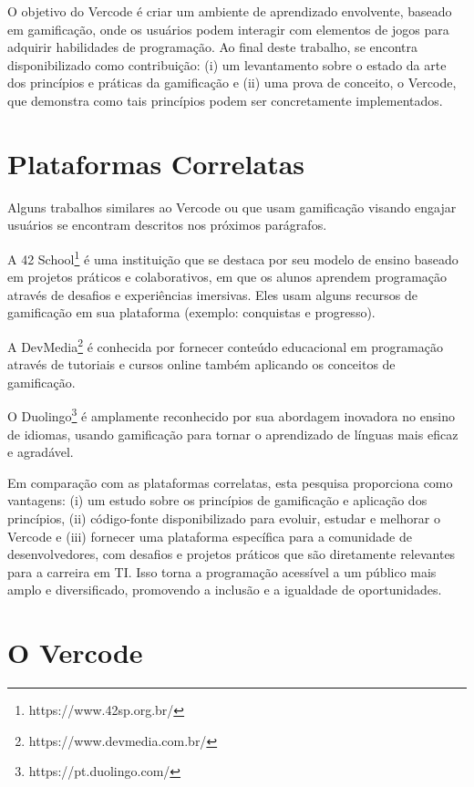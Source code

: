 \documentclass[12pt]{article}
\begin{document}
O objetivo do Vercode é criar um ambiente de aprendizado envolvente, baseado em gamificação, onde os usuários podem interagir com elementos de jogos para adquirir habilidades de programação. Ao final deste trabalho, se encontra disponibilizado como contribuição: (i) um levantamento sobre o estado da arte dos princípios e práticas da gamificação e (ii) uma prova de conceito, o Vercode, que demonstra como tais princípios podem ser concretamente implementados.

\section{Plataformas Correlatas} \label{sec:correlatos}

Alguns trabalhos similares ao Vercode ou que usam gamificação visando engajar usuários se encontram descritos nos próximos parágrafos.

A 42 School\footnote{https://www.42sp.org.br/} é uma instituição que se destaca por seu modelo de ensino baseado em projetos práticos e colaborativos, em que os alunos aprendem programação através de desafios e experiências imersivas. Eles usam alguns recursos de gamificação em sua plataforma (exemplo: conquistas e progresso).    

A DevMedia\footnote{https://www.devmedia.com.br/} é conhecida por fornecer conteúdo educacional em programação através de tutoriais e cursos online também aplicando os conceitos de gamificação.

O Duolingo\footnote{https://pt.duolingo.com/} é amplamente reconhecido por sua abordagem inovadora no ensino de idiomas, usando gamificação para tornar o aprendizado de línguas mais eficaz e agradável.

Em comparação com as plataformas correlatas, esta pesquisa proporciona como vantagens: (i) um estudo sobre os princípios de gamificação e aplicação dos princípios, (ii) código-fonte disponibilizado para evoluir, estudar e melhorar o Vercode e (iii) fornecer uma plataforma específica para a comunidade de desenvolvedores, com desafios e projetos práticos que são diretamente relevantes para a carreira em TI. Isso torna a programação acessível a um público mais amplo e diversificado, promovendo a inclusão e a igualdade de oportunidades. 

\section{O Vercode} \label{sec:vercode}
\end{document}
